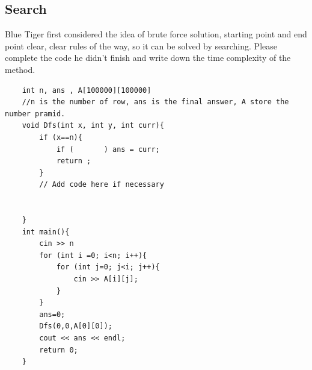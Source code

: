 \documentclass[11pt]{exam}
\begin{document}
\subsection{Search}
Blue Tiger first considered the idea of brute force solution, 
starting point and end point clear, clear rules of the way, so it can be solved by searching.
Please complete the code he didn't finish and write down the time complexity of the method.
\begin{lstlisting}
    int n, ans , A[100000][100000] 
    //n is the number of row, ans is the final answer, A store the number pramid.
    void Dfs(int x, int y, int curr){
        if (x==n){
            if (       ) ans = curr;
            return ;
        }
        // Add code here if necessary


    }
    int main(){
        cin >> n
        for (int i =0; i<n; i++){
            for (int j=0; j<i; j++){
                cin >> A[i][j];
            }
        }
        ans=0;
        Dfs(0,0,A[0][0]);
        cout << ans << endl;
        return 0;
    }
\end{lstlisting}
\begin{solution}
    \\ \hspace*{\fill} \\
    \\ \hspace*{\fill} \\
    \\ \hspace*{\fill} \\
    \\ \hspace*{\fill} \\
    \\ \hspace*{\fill} \\
    \\ \hspace*{\fill} \\
    \\ \hspace*{\fill} \\
    \\ \hspace*{\fill} \\
   
\end{solution}
\end{document}
